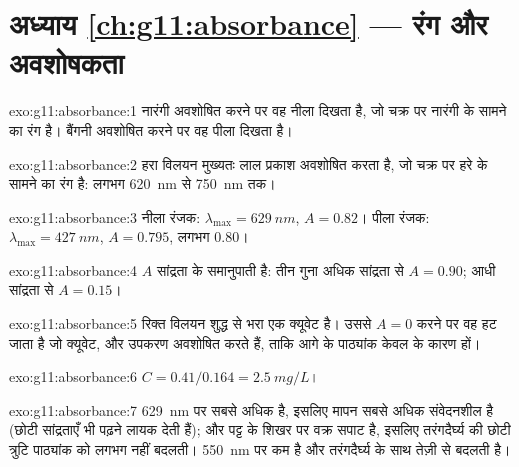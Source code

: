 \section*{अध्याय \ref{ch:g11:absorbance} --- रंग और अवशोषकता}

\begin{solution}{exo:g11:absorbance:1}
नारंगी अवशोषित करने पर वह नीला दिखता है, जो चक्र पर नारंगी के सामने का रंग है।
बैंगनी अवशोषित करने पर वह पीला दिखता है।
\end{solution}

\begin{solution}{exo:g11:absorbance:2}
हरा विलयन मुख्यतः लाल प्रकाश अवशोषित करता है, जो चक्र पर हरे के सामने का रंग है:
लगभग \qty{620}{nm} से \qty{750}{nm} तक।
\end{solution}

\begin{solution}{exo:g11:absorbance:3}
नीला रंजक: $\lambda_{\max} = \qty{629}{nm}$, $A = 0.82$। पीला रंजक:
$\lambda_{\max} = \qty{427}{nm}$, $A = 0.795$, लगभग 0.80।
\end{solution}

\begin{solution}{exo:g11:absorbance:4}
$A$ सांद्रता के समानुपाती है: तीन गुना अधिक सांद्रता से
$A = 0.90$; आधी सांद्रता से $A = 0.15$।
\end{solution}

\begin{solution}{exo:g11:absorbance:5}
रिक्त विलयन शुद्ध  से भरा एक क्यूवेट है। उससे $A = 0$ करने पर वह हट जाता
है जो क्यूवेट,  और उपकरण अवशोषित करते हैं, ताकि आगे के पाठ्यांक
केवल  के कारण हों।
\end{solution}

\begin{solution}{exo:g11:absorbance:6}
$C = 0.41 / 0.164 = \qty{2.5}{mg/L}$।
\end{solution}

\begin{solution}{exo:g11:absorbance:7}
\qty{629}{nm} पर  सबसे अधिक है, इसलिए मापन सबसे अधिक संवेदनशील है
(छोटी सांद्रताएँ भी पढ़ने लायक  देती हैं); और पट्ट के शिखर पर वक्र
सपाट है, इसलिए तरंगदैर्घ्य की छोटी त्रुटि पाठ्यांक को
लगभग नहीं बदलती। \qty{550}{nm} पर  कम है और तरंगदैर्घ्य के साथ
तेज़ी से बदलती है।
\end{solution}

